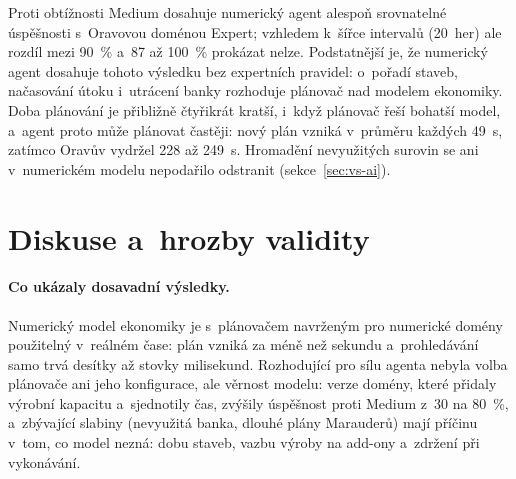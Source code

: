 Proti obtížnosti Medium dosahuje numerický agent alespoň srovnatelné úspěšnosti s~Oravovou doménou Expert; vzhledem k~šířce intervalů (20~her) ale rozdíl mezi 90~\% a~87 až 100~\% prokázat nelze. Podstatnější je, že numerický agent dosahuje tohoto výsledku bez expertních pravidel: o~pořadí staveb, načasování útoku i~utrácení banky rozhoduje plánovač nad modelem ekonomiky. Doba plánování je přibližně čtyřikrát kratší, i~když plánovač řeší bohatší model, a~agent proto může plánovat častěji: nový plán vzniká v~průměru každých 49~s, zatímco Oravův vydržel 228 až 249~s. Hromadění nevyužitých surovin se ani v~numerickém modelu nepodařilo odstranit (sekce~\ref{sec:vs-ai}).

\section{Diskuse a~hrozby validity}
\label{sec:diskuse}

\paragraph{Co ukázaly dosavadní výsledky.} Numerický model ekonomiky je s~plánovačem navrženým pro numerické domény použitelný v~reálném čase: plán vzniká za méně než sekundu a~prohledávání samo trvá desítky až stovky milisekund. Rozhodující pro sílu agenta nebyla volba plánovače ani jeho konfigurace, ale věrnost modelu: verze domény, které přidaly výrobní kapacitu a~sjednotily čas, zvýšily úspěšnost proti Medium z~30 na 80~\%, a~zbývající slabiny (nevyužitá banka, dlouhé plány Marauderů) mají příčinu v~tom, co model nezná: dobu staveb, vazbu výroby na add-ony a~zdržení při vykonávání.

